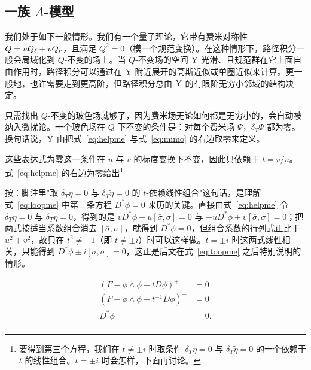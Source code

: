 
\subsection{一族 $A$-模型}

\label{sec:familya}

我们处于如下一般情形。我们有一个量子理论，它带有费米对称性 $Q=uQ_\ell+vQ_r$，且满足 $Q^2=0$（模一个规范变换）。在这种情形下，路径积分一般会局域化到 $Q$-不变的场上。当 $Q$-不变场的空间 ${{\mathrm{Y}}}$ 光滑、且规范群在它上面自由作用时，路径积分可以通过在 ${{\mathrm{Y}}}$ 附近展开的高斯近似或单圈近似来计算。更一般地，也许需要走到更高阶，但路径积分总由 ${{\mathrm{Y}}}$ 的有限阶无穷小邻域的结构决定。

只需找出 $Q$-不变的玻色场就够了，因为费米场无论如何都是无穷小的，会自动被纳入微扰论。一个玻色场在 $Q$ 下不变的条件是：对每个费米场 $\Psi$，$\delta_T\Psi$ 都为零。换句话说，${{\mathrm{Y}}}$ 由把式~\eqref{eq:helpme} 与式~\eqref{eq:mimo} 的右边取零来定义。

这些表达式为零这一条件在 $u$ 与 $v$ 的标度变换下不变，因此只依赖于 $t=v/u$。式~\eqref{eq:helpme} 的右边为零给出\footnote{要得到第三个方程，我们在 $t\not=\pm i$ 时取条件 $\delta_T\eta=0$ 与 $\delta_T\tilde\eta=0$ 的一个依赖于 $t$ 的线性组合。$t=\pm i$ 时会怎样，下面再讨论。}

\begin{yizhu}[易错点]
按：脚注里"取 $\delta_T\eta=0$ 与 $\delta_T\tilde\eta=0$ 的 $t$-依赖线性组合"这句话，是理解式~\eqref{eq:loopme} 中第三条方程 $D^*\phi=0$ 来历的关键。直接由式~\eqref{eq:helpme} 令 $\delta_T\eta=0$ 与 $\delta_T\tilde\eta=0$，得到的是 $vD^*\phi+u[\bar\sigma,\sigma]=0$ 与 $-uD^*\phi+v[\bar\sigma,\sigma]=0$；把两式按适当系数组合消去 $[\bar\sigma,\sigma]$，就得到 $D^*\phi=0$，但组合系数的行列式正比于 $u^2+v^2$，故只在 $t^2\not=-1$（即 $t\not=\pm i$）时可以这样做。$t=\pm i$ 时这两式线性相关，只能得到 $D^*\phi\pm i[\bar\sigma,\sigma]=0$，这正是后文在式~\eqref{eq:toopme} 之后特别说明的情形。
\end{yizhu}
\setcounter{equation}{28}
\begin{equation}\label{eq:loopme}
\begin{aligned}(F-\phi\wedge\phi+tD\phi)^+ & = 0
\\
                      (F-\phi\wedge\phi-t^{-1}D\phi)^-& = 0 \\
                      D^* \phi & = 0.\\\end{aligned}
\end{equation}

